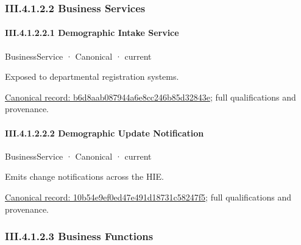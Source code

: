 \subsubsection*{III.4.1.2.2 Business Services}
\label{navigation:III.4.1.2.2}

\paragraph*{III.4.1.2.2.1 Demographic Intake Service}
\label{navigation:III.4.1.2.2.1}

\label{element:b6d8aab087944a6e8cc246b85d32843e}
{\small BusinessService · Canonical · current}\par

Exposed to departmental registration systems.


{\footnotesize \href{../../../../continuum/business/business-service/b6d8aab087944a6e8cc246b85d32843e.md}{Canonical record: b6d8aab087944a6e8cc246b85d32843e}; full qualifications and provenance.}\par
\paragraph*{III.4.1.2.2.2 Demographic Update Notification}
\label{navigation:III.4.1.2.2.2}

\label{element:10b54e9ef0ed47e491d18731c58247f5}
{\small BusinessService · Canonical · current}\par

Emits change notifications across the HIE.


{\footnotesize \href{../../../../continuum/business/business-service/10b54e9ef0ed47e491d18731c58247f5.md}{Canonical record: 10b54e9ef0ed47e491d18731c58247f5}; full qualifications and provenance.}\par
\subsubsection*{III.4.1.2.3 Business Functions}
\label{navigation:III.4.1.2.3}

